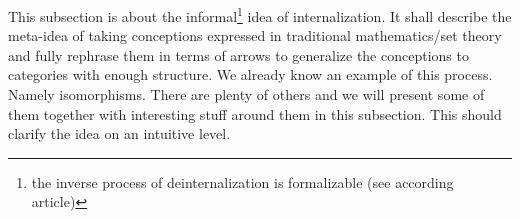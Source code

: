 \nocite{eec64bc7}
This subsection is about the informal\footnote{the inverse process of deinternalization is formalizable (see according \cite{wiki-nlab0000} article)} idea of internalization. It shall describe the meta-idea of taking conceptions expressed in traditional mathematics/set theory and fully rephrase them in terms of arrows to generalize the conceptions to categories with enough structure. We already know an example of this process. Namely isomorphisms. There are plenty of others and we will present some of them together with interesting stuff around them in this subsection. This should clarify the idea on an intuitive level.
\\
